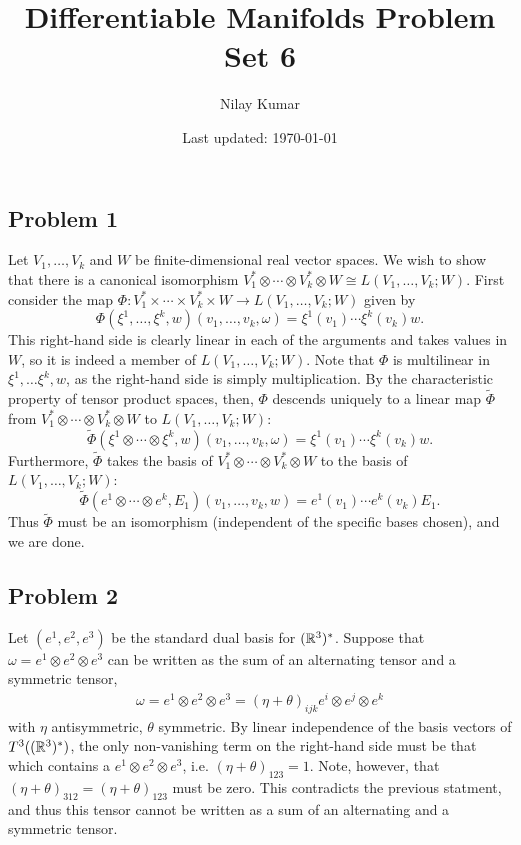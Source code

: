 \documentclass{../../mathnotes}
\title{Differentiable Manifolds Problem Set 6}
\author{Nilay Kumar}
\date{Last updated: \today}
\begin{document}
\maketitle

\subsection*{Problem 1}

Let $V_1,\ldots, V_k$ and $W$ be finite-dimensional real vector spaces. We wish to show that there is a canonical isomorphism
$V_1^* \otimes \cdots \otimes V_k^*\otimes W\cong L(V_1,\ldots,V_k;W)$. First consider the map
$\Phi:V_1^*\times \cdots \times V_k^*\times W\to L(V_1,\ldots,V_k;W)$ given by
\[\Phi(\xi^1,\ldots,\xi^k,w)(v_1,\ldots,v_k,\omega)=\xi^1(v_1)\cdots\xi^k(v_k)w.\]
This right-hand side is clearly linear in each of the arguments and takes values in $W$, so it is indeed a member of
$L(V_1,\ldots,V_k;W)$. Note that $\Phi$ is multilinear in $\xi^1,\ldots\xi^k,w$, as the right-hand side is simply
multiplication. By the characteristic property of tensor product spaces, then, $\Phi$ descends uniquely to a linear map
$\tilde\Phi$ from $V_1^* \otimes \cdots \otimes V_k^*\otimes W$ to $L(V_1,\ldots,V_k;W)$:
\[\tilde\Phi(\xi^1 \otimes \cdots \otimes \xi^k,w)(v_1,\ldots,v_k,\omega)=\xi^1(v_1)\cdots\xi^k(v_k)w.\]
Furthermore, $\tilde\Phi$ takes the basis of $V_1^* \otimes \cdots \otimes V_k^*\otimes W$ to the
basis of $L(V_1,\ldots,V_k;W)$:
\[\tilde\Phi(e^1\otimes\cdots\otimes e^k, E_1)(v_1,\ldots,v_k,w)=e^1(v_1)\cdots e^k(v_k)E_1.\]
Thus $\tilde\Phi$ must be an isomorphism (independent of the specific bases chosen), and we are done.

\subsection*{Problem 2}

Let $(e^1,e^2,e^3)$ be the standard dual basis for $(\mathbb{R}^3)^*$. Suppose that $\omega=e^1\otimes e^2\otimes e^3$ can be written
as the sum of an alternating tensor and a symmetric tensor,
\begin{align*}
    \omega=e^1\otimes e^2\otimes e^3=\left(\eta+\theta\right)_{ijk}e^i\otimes e^j\otimes e^k
\end{align*}
with $\eta$ antisymmetric, $\theta$ symmetric. By linear independence of the basis vectors of $T^3( (\mathbb{R}^3)^*)$,
the only non-vanishing term on the right-hand side must be that which contains a $e^1\otimes e^2\otimes e^3$,
i.e. $(\eta+\theta)_{123}=1$. Note, however, that $(\eta+\theta)_{312}=(\eta+\theta)_{123}$ must be zero. This
contradicts the previous statment, and thus this tensor cannot be written as a sum of an alternating and a symmetric
tensor.
\end{document}

